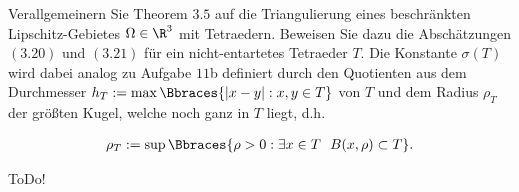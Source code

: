 
\begin{exercise}

Verallgemeinern Sie Theorem $3.5$ auf die Triangulierung eines beschränkten Lipschitz-Gebietes $\Omega \in \R^3$ mit Tetraedern. Beweisen Sie dazu die Abschätzungen $(3.20)$ und $(3.21)$ für ein nicht-entartetes Tetraeder $T$. Die Konstante $\sigma(T)$ wird dabei analog zu Aufgabe $11$b definiert durch den Quotienten aus dem Durchmesser $h_T := \max \Bbraces{|x-y|:x,y \in T}$ von $T$ und dem Radius $\rho_T$ der größten Kugel, welche noch ganz in $T$ liegt, d.h.

\begin{align}
  \rho_T
  :=
  \sup\Bbraces{\rho > 0: \exists x \in T~~ B(x,\rho) \subset T}.
\end{align}

\end{exercise}


\begin{solution}

ToDo!

\end{solution}

